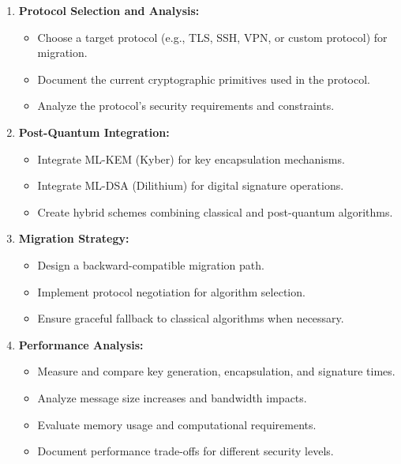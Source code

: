 \documentclass[10pt,a4paper,american]{article}
\begin{document}
\begin{enumerate}
	\item \textbf{Protocol Selection and Analysis:}
	      \begin{itemize}
		      \item Choose a target protocol (e.g., TLS, SSH, VPN, or custom protocol) for migration.
		      \item Document the current cryptographic primitives used in the protocol.
		      \item Analyze the protocol's security requirements and constraints.
	      \end{itemize}

	\item \textbf{Post-Quantum Integration:}
	      \begin{itemize}
		      \item Integrate ML-KEM (Kyber) for key encapsulation mechanisms.
		      \item Integrate ML-DSA (Dilithium) for digital signature operations.
		      \item Create hybrid schemes combining classical and post-quantum algorithms.
	      \end{itemize}

	\item \textbf{Migration Strategy:}
	      \begin{itemize}
		      \item Design a backward-compatible migration path.
		      \item Implement protocol negotiation for algorithm selection.
		      \item Ensure graceful fallback to classical algorithms when necessary.
	      \end{itemize}

	\item \textbf{Performance Analysis:}
	      \begin{itemize}
		      \item Measure and compare key generation, encapsulation, and signature times.
		      \item Analyze message size increases and bandwidth impacts.
		      \item Evaluate memory usage and computational requirements.
		      \item Document performance trade-offs for different security levels.
	      \end{itemize}
\end{enumerate}
\end{document}
